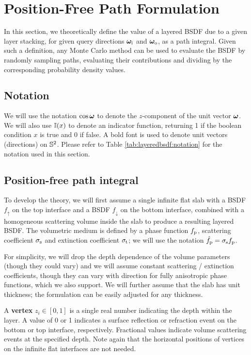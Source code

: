 \section{Position-Free Path Formulation}
\label{sec:layeredbsdf:pathformulation}

In this section, we theoretically define the value of a layered BSDF due to a given layer stacking, for given query directions $\bm\omega_\mathrm{i}$ and $\bm\omega_\mathrm{o}$, as a path integral. Given such a definition, any Monte Carlo method can be used to evaluate the BSDF by randomly sampling paths, evaluating their contributions and dividing by the corresponding probability density values.

\subsection{Notation}

We will use the notation $\cos \bm\omega$ to denote the $z$-component of the unit vector $\bm\omega$. We will also use $\mathbb{I}(x)$ to denote an indicator function, returning 1 if the boolean condition $x$ is true and 0 if false. A bold font is used to denote unit vectors (directions) on $\mathbb{S}^2$. Please refer to Table \ref{tab:layeredbsdf:notation} for the notation used in this section.



\subsection{Position-free path integral}

To develop the theory, we will first assume a single infinite flat slab with a BSDF $f_\uparrow$ on the top interface and a BSDF $f_\downarrow$ on the bottom interface, combined with a homogeneous scattering volume inside the slab to produce a resulting layered BSDF. The volumetric medium is defined by a phase function $f_\mathrm{p}$, scattering coefficient $\sigma_\mathrm{s}$ and extinction coefficient $\sigma_\mathrm{t}$; we will use the notation $\hat f_\mathrm{p} = \sigma_\mathrm{s} f_\mathrm{p}$.

For simplicity, we will drop the depth dependence of the volume parameters (though they could vary) and we will assume constant scattering / extinction coefficients, though they can vary with direction for fully anisotropic phase functions, which we also support. We will further assume that the slab has unit thickness; the formulation can be easily adjusted for any thickness.

A {\bf vertex} $z_i \in [0, 1]$ is a single real number indicating the depth within the layer. A value of 0 or 1 indicates a surface reflection or refraction event on the bottom or top interface, respectively. Fractional values indicate volume scattering events at the specified depth. Note again that the horizontal positions of vertices on the infinite flat interfaces are not needed.


